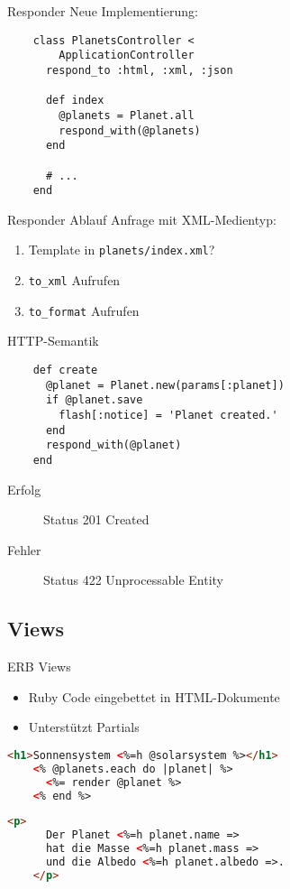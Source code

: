 \begin{Frame}[fragile]{Responder}
  Neue Implementierung:
  \begin{lstlisting}
    class PlanetsController <
        ApplicationController
      respond_to :html, :xml, :json

      def index
        @planets = Planet.all
        respond_with(@planets)
      end

      # ...
    end
  \end{lstlisting}
\end{Frame}

\begin{Frame}{Responder Ablauf}
  Anfrage mit XML-Medientyp:
  \begin{enumerate}
    \item Template in \lstinline|planets/index.xml|?
    \item \lstinline|to_xml| Aufrufen
    \item \lstinline|to_format| Aufrufen
  \end{enumerate}
\end{Frame}

\begin{Frame}[fragile]{HTTP-Semantik}
  \begin{lstlisting}
    def create
      @planet = Planet.new(params[:planet])
      if @planet.save
        flash[:notice] = 'Planet created.'
      end
      respond_with(@planet)
    end
  \end{lstlisting}

  \begin{description}
    \item[Erfolg] Status 201 Created
    \item[Fehler] Status 422 Unprocessable Entity
  \end{description}
\end{Frame}

\subsection{Views}

\begin{Frame}[fragile]{ERB Views}
  \begin{itemize}
    \item Ruby Code eingebettet in HTML-Dokumente
    \item Unterstützt Partials
  \end{itemize}

  \begin{lstlisting}[language=HTML]
    <h1>Sonnensystem <%=h @solarsystem %></h1>
    <% @planets.each do |planet| %>
      <%= render @planet %>
    <% end %>
  \end{lstlisting}

  \begin{lstlisting}[language=HTML]
    <p>
      Der Planet <%=h planet.name =>
      hat die Masse <%=h planet.mass =>
      und die Albedo <%=h planet.albedo =>.
    </p>
  \end{lstlisting}
\end{Frame}

